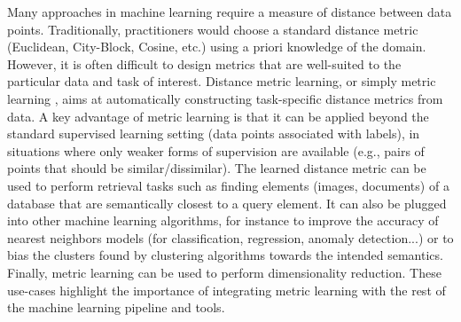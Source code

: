 \documentclass[twoside,11pt]{article}
\begin{document}
Many approaches in machine learning require a measure of distance between data
points. Traditionally, practitioners would choose a standard distance metric
(Euclidean, City-Block, Cosine, etc.) using a priori knowledge of the
domain. However, it is often difficult to design metrics that are well-suited
to the particular data and task of interest.
Distance metric learning, or simply metric learning \citep{Bellet15}, aims at
automatically constructing task-specific distance metrics from data. A key advantage of metric learning is that it can be applied beyond the standard supervised learning setting (data points associated with labels), in situations where only weaker forms of supervision are available (e.g., pairs of points that should be similar/dissimilar). The learned distance metric can be used to perform retrieval tasks such as finding elements (images, documents) of a database that are semantically closest to a query element. It can also be plugged into other machine learning algorithms, for instance to improve the accuracy of nearest neighbors models (for classification, regression, anomaly detection...) or to bias the clusters found by clustering algorithms towards the intended semantics. Finally, metric learning can be used to perform dimensionality reduction.
These use-cases highlight the importance of integrating metric learning with the rest of the machine learning pipeline and tools.
\end{document}
